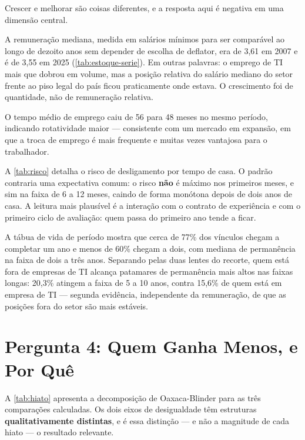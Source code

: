 Crescer e melhorar são coisas diferentes, e a resposta aqui é negativa em uma dimensão central.

A remuneração mediana, medida em salários mínimos para ser comparável ao longo de dezoito anos sem depender de escolha de deflator, era de 3,61 em 2007 e é de 3,55 em 2025 (\autoref{tab:estoque-serie}). Em outras palavras: o emprego de TI mais que dobrou em volume, mas a posição relativa do salário mediano do setor frente ao piso legal do país ficou praticamente onde estava. O crescimento foi de quantidade, não de remuneração relativa.

O tempo médio de emprego caiu de 56 para 48 meses no mesmo período, indicando rotatividade maior --- consistente com um mercado em expansão, em que a troca de emprego é mais frequente e muitas vezes vantajosa para o trabalhador.



A \autoref{tab:risco} detalha o risco de desligamento por tempo de casa. O padrão contraria uma expectativa comum: o risco \textbf{não} é máximo nos primeiros meses, e sim na faixa de 6 a 12 meses, caindo de forma monótona depois de dois anos de casa. A leitura mais plausível é a interação com o contrato de experiência e com o primeiro ciclo de avaliação: quem passa do primeiro ano tende a ficar.

A tábua de vida de período mostra que cerca de 77\% dos vínculos chegam a completar um ano e menos de 60\% chegam a dois, com mediana de permanência na faixa de dois a três anos. Separando pelas duas lentes do recorte, quem está fora de empresas de TI alcança patamares de permanência mais altos nas faixas longas: 20,3\% atingem a faixa de 5 a 10 anos, contra 15,6\% de quem está em empresa de TI --- segunda evidência, independente da remuneração, de que as posições fora do setor são mais estáveis.

\section{Pergunta 4: Quem Ganha Menos, e Por Quê}
\label{sec:resultado-q4}



A \autoref{tab:hiato} apresenta a decomposição de Oaxaca-Blinder para as três comparações calculadas. Os dois eixos de desigualdade têm estruturas \textbf{qualitativamente distintas}, e é essa distinção --- e não a magnitude de cada hiato --- o resultado relevante.

